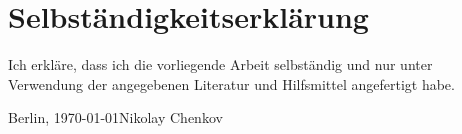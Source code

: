 \chapter*{Selbständigkeitserkl\"a{}rung}


Ich erkl\"a{}re, dass ich die vorliegende Arbeit selbst\"a{}ndig und nur unter Verwendung der angegebenen Literatur und Hilfsmittel angefertigt habe.
\vspace{3cm}

Berlin, \today  \hfill  Nikolay Chenkov
